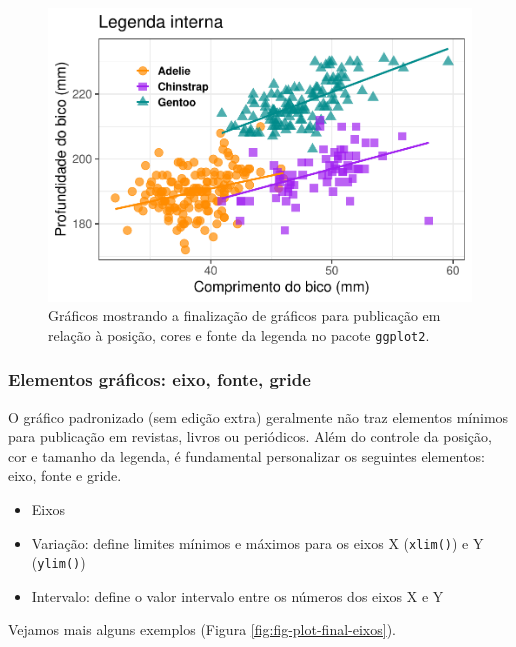\documentclass[
]{article}
\providecommand{\tightlist}{%
  \setlength{\itemsep}{0pt}\setlength{\parskip}{0pt}}
\begin{document}
\begin{figure}
\centering
\includegraphics{epr_files/figure-latex/fig-plot-final-legenda-5.pdf}
\caption{\label{fig:fig-plot-final-legenda-5}Gráficos mostrando a finalização de gráficos para publicação em relação à posição, cores e fonte da legenda no pacote \texttt{ggplot2}.}
\end{figure}

\hypertarget{elementos-gruxe1ficos-eixo-fonte-gride}{%
\subsubsection{Elementos gráficos: eixo, fonte, gride}\label{elementos-gruxe1ficos-eixo-fonte-gride}}

O gráfico padronizado (sem edição extra) geralmente não traz elementos mínimos para publicação em revistas, livros ou periódicos. Além do controle da posição, cor e tamanho da legenda, é fundamental personalizar os seguintes elementos: eixo, fonte e gride.

\begin{itemize}
\tightlist
\item
  Eixos
\item
  Variação: define limites mínimos e máximos para os eixos X (\texttt{xlim()}) e Y (\texttt{ylim()})
\item
  Intervalo: define o valor intervalo entre os números dos eixos X e Y
\end{itemize}

Vejamos mais alguns exemplos (Figura \ref{fig:fig-plot-final-eixos}).
\end{document}
